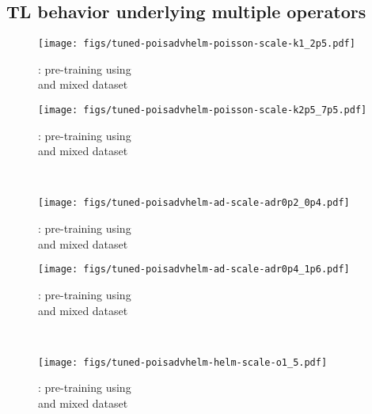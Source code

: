 \subsection{TL behavior underlying multiple operators}
\label{sec:multiple}
\begin{figure*}
\begin{subfigure}{.5\textwidth}
  \centering
  \texttt{[image: figs/tuned-poisadvhelm-poisson-scale-k1\_2p5.pdf]}  
  \caption{\sysAonetwoptfive{}: pre-training using \\ \sysAonefive{}  and mixed dataset}
  \label{fig:pois-poisadvhelm-1-2p5}
\end{subfigure}%
\begin{subfigure}{.5\textwidth}
  \centering
  \texttt{[image: figs/tuned-poisadvhelm-poisson-scale-k2p5\_7p5.pdf]}  
  \caption{\sysAtwoptfivesevenptfive{}: pre-training using  \\ \sysAonefive{}  and mixed dataset}
  \label{fig:pois-poisadvhelm-2p5-7p5}
\end{subfigure}\\
\begin{subfigure}{.5\textwidth}
  \centering
  \texttt{[image: figs/tuned-poisadvhelm-ad-scale-adr0p2\_0p4.pdf]}  
  \caption{\sysBzeropttwozeroptfour{}: pre-training using \\ \sysBzeropttwoone{}  and mixed dataset}
  \label{fig:ad-poisadvhelm-0p2-0p4}
\end{subfigure}%
\begin{subfigure}{.5\textwidth}
  \centering
  \texttt{[image: figs/tuned-poisadvhelm-ad-scale-adr0p4\_1p6.pdf]}  
  \caption{\sysBzeroptfouroneptsix{}: pre-training using \\ \sysBzeropttwoone{}  and mixed dataset}
  \label{fig:ad-poisadvhelm-0p4-1p6}
\end{subfigure}\\
\begin{subfigure}{.5\textwidth}
  \centering
  \texttt{[image: figs/tuned-poisadvhelm-helm-scale-o1\_5.pdf]}  
  \caption{\sysConefive{}: pre-training using \\ \sysConeten{}  and mixed dataset}
  \label{fig:helm-poisadvhelm-1-5}
\end{subfigure}%
\begin{subfigure}{.5\textwidth}

\end{subfigure}
\end{figure*}
